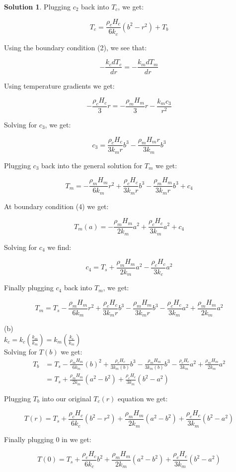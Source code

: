 \documentclass[titlepage, 11pt]{article}
\theoremstyle{definition}
\newtheorem*{solution}{Solution}
\begin{document}
\begin{solution}
Plugging $c_2$ back into $T_c$, we get:

$$\boxed{ T_c = \frac{\rho_c H_c}{6k_c}\left( b^2 - r^2 \right) + T_b}$$

Using the boundary condition (2), we see that:

$$-\frac{k_c dT_c}{dr} = -\frac{k_m dT_m}{dr}$$

Using temperature gradients we get:

$$-\frac{\rho_c H_c}{3}r = -\frac{\rho_m H_m}{3}r - \frac{k_m c_3}{r^2}$$

Solving for $c_3$, we get:

$$c_3 = \frac{\rho_c H_c}{3k_m r}b^3 - \frac{\rho_m H_m r}{3k_m}b^3$$

Plugging $c_3$ back into the general solution for $T_m$ we get:

$$T_m = -\frac{\rho_m H_m}{6k_m}r^2 + \frac{\rho_c H_c}{3k_m r}b^3 - \frac{\rho_m H_m}{3k_m r}b^3 + c_4$$

At boundary condition (4) we get:

$$T_m (a) = -\frac{\rho_m H_m}{2k_m}a^2 + \frac{\rho_c H_c}{3k_m}a^2 + c_4$$

\newpage
Solving for $c_4$ we find:

$$c_4 = T_s + \frac{\rho_m H_m}{2k_m}a^2 - \frac{\rho_c H_c}{3k_c}a^2$$

Finally plugging $c_4$ back into $T_m$, we get:

$$\boxed{ T_m = T_s - \frac{\rho_m H_m}{6k_m}r^2 + \frac{\rho_c H_c}{3k_m r}b^3 - \frac{\rho_m H_m}{3k_m r}b^3 - \frac{\rho_c H_c}{3k_m}a^2 + \frac{\rho_m H_m}{2k_m}a^2}$$

\noindent
(b)\\

$k_c = k_c\left(\frac{k_m}{k_m}\right) = k_m\left( \frac{k_c}{k_m} \right)$\\

Solving for $T(b)$ we get:
\begin{align*}
T_b & = T_s -\frac{\rho_m H_m}{6k_m}(b)^2 + \frac{\rho_c H_c}{3k_m (b)}b^3 - \frac{\rho_m H_m}{3k_m (b)}b^3 - \frac{\rho_c H_c}{3k_m}a^2 + \frac{\rho_m H_m}{2k_m}a^2\\
& = T_s + \frac{\rho_m H_m}{2k_m}\left( a^2 - b^2 \right) + \frac{\rho_c H_c}{3k_m}\left(b^2-a^2\right)
\end{align*}

Plugging $T_b$ into our original $T_c(r)$ equation we get:


    $$T(r) = T_s + \frac{\rho_c H_c}{6k_c}\left( b^2 - r^2 \right) + \frac{\rho_m H_m}{2k_m}\left( a^2 - b^2 \right) + \frac{\rho_c H_c}{3k_m}\left( b^2 - a^2 \right)$$
    
Finally plugging 0 in we get:

    $$\boxed{T(0) = T_s + \frac{\rho_c H_c}{6k_c}b^2 + \frac{\rho_m H_m}{2k_m}\left( a^2 - b^2 \right) + \frac{\rho_c H_c}{3k_m}\left( b^2 - a^2 \right)}$$


\end{solution}
\end{document}
